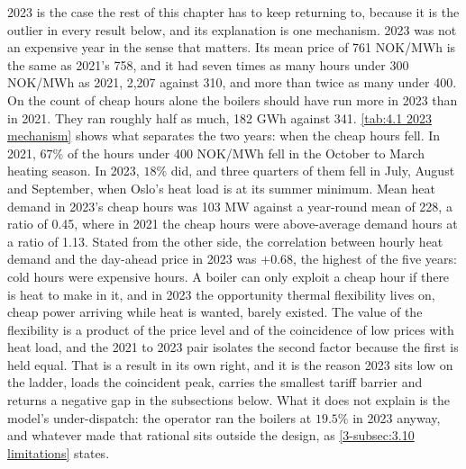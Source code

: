 2023 is the case the rest of this chapter has to keep returning to, because it is the outlier in every result below, and its explanation is one mechanism. 2023 was not an expensive year in the sense that matters. Its mean price of 761 NOK/MWh is the same as 2021's 758, and it had seven times as many hours under 300 NOK/MWh as 2021, 2{,}207 against 310, and more than twice as many under 400. On the count of cheap hours alone the boilers should have run more in 2023 than in 2021. They ran roughly half as much, 182 GWh against 341. \autoref{tab:4.1 2023 mechanism} shows what separates the two years: when the cheap hours fell. In 2021, $67\%$ of the hours under 400 NOK/MWh fell in the October to March heating season. In 2023, $18\%$ did, and three quarters of them fell in July, August and September, when Oslo's heat load is at its summer minimum. Mean heat demand in 2023's cheap hours was 103 MW against a year-round mean of 228, a ratio of 0.45, where in 2021 the cheap hours were above-average demand hours at a ratio of 1.13. Stated from the other side, the correlation between hourly heat demand and the day-ahead price in 2023 was $+0.68$, the highest of the five years: cold hours were expensive hours. A boiler can only exploit a cheap hour if there is heat to make in it, and in 2023 the opportunity thermal flexibility lives on, cheap power arriving while heat is wanted, barely existed. The value of the flexibility is a product of the price level and of the coincidence of low prices with heat load, and the 2021 to 2023 pair isolates the second factor because the first is held equal. That is a result in its own right, and it is the reason 2023 sits low on the ladder, loads the coincident peak, carries the smallest tariff barrier and returns a negative gap in the subsections below. What it does not explain is the model's under-dispatch: the operator ran the boilers at $19.5\%$ in 2023 anyway, and whatever made that rational sits outside the design, as \autoref{3-subsec:3.10 limitations} states.

